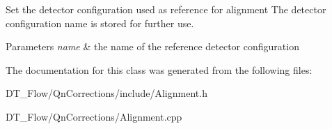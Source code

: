 Set the detector configuration used as reference for alignment The detector configuration name is stored for further use. 
\begin{DoxyParams}{Parameters}
{\em name} & the name of the reference detector configuration \\
\hline
\end{DoxyParams}


The documentation for this class was generated from the following files\+:\begin{DoxyCompactItemize}
\item 
D\+T\+\_\+\+Flow/\+Qn\+Corrections/include/Alignment.\+h\item 
D\+T\+\_\+\+Flow/\+Qn\+Corrections/Alignment.\+cpp\end{DoxyCompactItemize}
